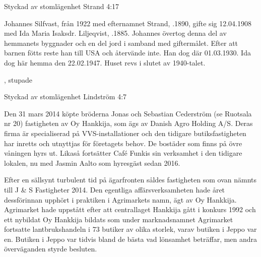 %

Styckad av stomlägenhet Strand 4:17

%
Johannes Silfvast, från 1922 med efternamnet Strand, .1890, gifte sig 12.04.1908 med Ida Maria Isaksdr. Liljeqvist, .1885. Johannes övertog denna del av hemmanets byggnader och en del jord i samband med giftermålet. Efter att barnen fötts reste han till USA och återvände inte. Han dog där 01.03.1930. Ida dog här hemma den 22.02.1947. Huset revs i slutet av 1940-talet.
\begin{jhchildren}
  \item {}
  \item {}
  \item {}
  \item {}
  \item {}, stupade
  \item {}
\end{jhchildren}


%

Styckad av stomlägenhet Lindström 4:7

%
Den 31 mars 2014 köpte bröderna Jonas och Sebastian Cederström (se Ruotsala nr 20) fastigheten av Oy Hankkija, som ägs av Danish Agro Holding A/S. Deras firma är specialiserad på VVS-installationer och den tidigare butiksfastigheten har inretts och utnyttjas för företagets behov. De bostäder som finns på övre våningen hyrs ut. Likaså fortsätter Café Funkis sin verksamhet i den tidigare lokalen, nu med Jasmin Aalto som hyresgäst sedan 2016.



%
Efter en sällsynt turbulent tid på ägarfronten såldes fastigheten som ovan nämnts till J \& S Fastigheter 2014. Den egentliga affärsverksamheten hade året dessförinnan upphört i praktiken i Agrimarkets namn, ägt av Oy Hankkija. Agrimarket hade uppstått efter att centrallaget Hankkija gått i konkurs 1992 och ett nybildat Oy Hankkija bildats som under marknadsnamnet Agrimarket fortsatte lantbrukshandeln i 73 butiker av olika storlek, varav butiken i Jeppo var en. Butiken i Jeppo var tidvis bland de bästa vad lönsamhet beträffar, men andra överväganden styrde besluten.

